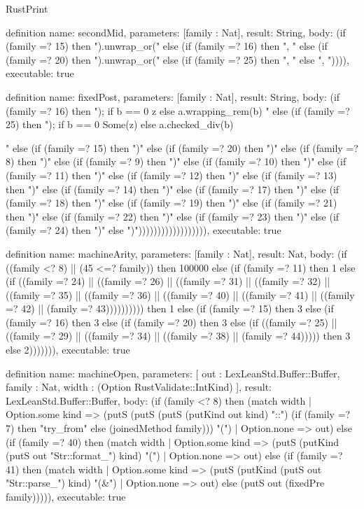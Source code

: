 \begin{lexlean}{RustPrint}
\begin{semanticmodule}
{{definition{
  name: secondMid,
  parameters: [family : Nat],
  result: String,
  body: (if (family =? 15) then ").unwrap_or(" else (if (family =? 16) then ", " else (if (family =? 20) then ").unwrap_or(" else (if (family =? 25) then ", " else ", ")))),
  executable: true
}

definition{
  name: fixedPost,
  parameters: [family : Nat],
  result: String,
  body: (if (family =? 16) then "); if b == 0 { z } else { a.wrapping_rem(b) } }" else (if (family =? 25) then "); if b == 0 { Some(z) } else { a.checked_div(b) } }" else (if (family =? 15) then ")" else (if (family =? 20) then ")" else (if (family =? 8) then ")" else (if (family =? 9) then ")" else (if (family =? 10) then ")" else (if (family =? 11) then ")" else (if (family =? 12) then ")" else (if (family =? 13) then ")" else (if (family =? 14) then ")" else (if (family =? 17) then ")" else (if (family =? 18) then ")" else (if (family =? 19) then ")" else (if (family =? 21) then ")" else (if (family =? 22) then ")" else (if (family =? 23) then ")" else (if (family =? 24) then ")" else ")")))))))))))))))))),
  executable: true
}

definition{
  name: machineArity,
  parameters: [family : Nat],
  result: Nat,
  body: (if ((family <? 8) || (45 <=? family)) then 100000 else (if (family =? 11) then 1 else (if ((family =? 24) || ((family =? 26) || ((family =? 31) || ((family =? 32) || ((family =? 35) || ((family =? 36) || ((family =? 40) || ((family =? 41) || ((family =? 42) || (family =? 43)))))))))) then 1 else (if (family =? 15) then 3 else (if (family =? 16) then 3 else (if (family =? 20) then 3 else (if ((family =? 25) || ((family =? 29) || ((family =? 34) || ((family =? 38) || (family =? 44))))) then 3 else 2))))))),
  executable: true
}

definition{
  name: machineOpen,
  parameters: [
    out : LexLeanStd.Buffer::Buffer,
    family : Nat,
    width : (Option RustValidate::IntKind)
  ],
  result: LexLeanStd.Buffer::Buffer,
  body: (if (family <? 8) then (match width
    | Option.some kind => (putS (putS (putS (putKind out kind) "::") (if (family =? 7) then "try_from" else (joinedMethod family))) "(")
    | Option.none => out) else (if (family =? 40) then (match width
    | Option.some kind => (putS (putKind (putS out "Str::format_") kind) "(")
    | Option.none => out) else (if (family =? 41) then (match width
    | Option.some kind => (putS (putKind (putS out "Str::parse_") kind) "(&")
    | Option.none => out) else (putS out (fixedPre family))))),
  executable: true
}


\end{semanticmodule}
\end{lexlean}
